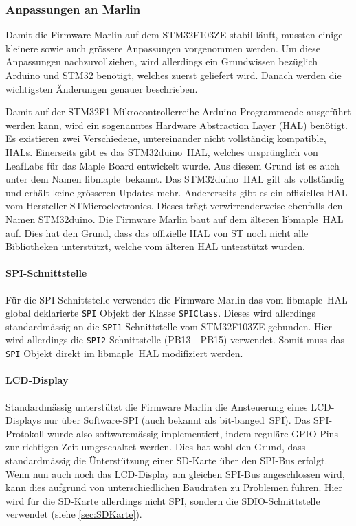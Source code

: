 \subsubsection{Anpassungen an Marlin}
\label{sec:AnpassungeMarlin}
Damit die Firmware Marlin auf dem STM32F103ZE stabil läuft, mussten einige kleinere sowie auch grössere Anpassungen vorgenommen werden.
Um diese Anpassungen nachzuvollziehen, wird allerdings ein Grundwissen bezüglich Arduino und STM32 benötigt, welches zuerst geliefert wird.
Danach werden die wichtigsten Änderungen genauer beschrieben.

Damit auf der STM32F1 Mikrocontrollerreihe Arduino-Programmcode ausgeführt werden kann, wird ein sogenanntes Hardware Abstraction Layer (HAL) benötigt.
Es existieren zwei Verschiedene, untereinander nicht vollständig kompatible, HALs.
Einerseits gibt es das \flqq STM32duino\frqq\ HAL, welches ursprünglich von LeafLabs für das Maple Board entwickelt wurde. Aus diesem Grund ist es auch unter dem Namen \flqq libmaple\frqq\ bekannt.
Das \flqq STM32duino\frqq\ HAL gilt als vollständig und erhält keine grösseren Updates mehr.
Andererseits gibt es ein offizielles HAL vom Hersteller STMicroelectronics. Dieses trägt verwirrenderweise ebenfalls den Namen \flqq STM32duino\frqq . Die Firmware Marlin baut auf dem älteren \flqq libmaple\frqq\ HAL auf. Dies hat den Grund, dass das offizielle HAL von ST noch nicht alle Bibliotheken unterstützt, welche vom älteren HAL unterstützt wurden.

\paragraph{SPI-Schnittstelle}
Für die SPI-Schnittstelle verwendet die Firmware Marlin das vom \flqq libmaple\frqq\ HAL global deklarierte \texttt{SPI} Objekt der Klasse \texttt{SPIClass}. Dieses wird allerdings standardmässig an die \texttt{SPI1}-Schnittstelle vom STM32F103ZE gebunden. Hier wird allerdings die \texttt{SPI2}-Schnittstelle (PB13 - PB15) verwendet. Somit muss das \texttt{SPI} Objekt direkt im \flqq libmaple\frqq\ HAL modifiziert werden.

\paragraph{LCD-Display}
Standardmässig unterstützt die Firmware Marlin die Ansteuerung eines LCD-Displays nur über Software-SPI (auch bekannt als \flqq bit-banged\frqq\ SPI). Das SPI-Protokoll wurde also softwaremässig implementiert, indem reguläre GPIO-Pins zur richtigen Zeit umgeschaltet werden. Dies hat wohl den Grund, dass standardmässig die Ünterstützung einer SD-Karte über den SPI-Bus erfolgt. Wenn nun auch noch das LCD-Display am gleichen SPI-Bus angeschlossen wird, kann dies aufgrund von unterschiedlichen Baudraten zu Problemen führen. Hier wird für die SD-Karte allerdings nicht SPI, sondern die SDIO-Schnittstelle verwendet (siehe \ref{sec:SDKarte}).

